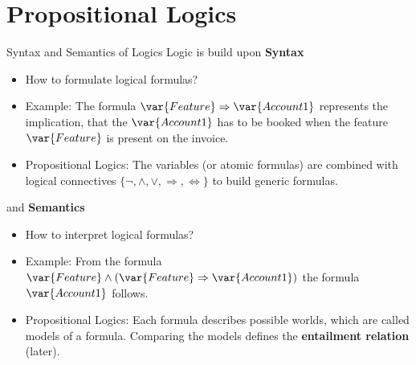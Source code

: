 \documentclass{beamer}
\begin{document}
    {\frame[plain]{\titlepage}}
    \showoutlineatsection

    \section{Propositional Logics}

    \begin{frame}{Syntax and Semantics of Logics}
        Logic is build upon
        \textbf{Syntax}
        \begin{itemize}
            \item How to formulate logical formulas?
            \item Example: The formula $\var{Feature}\Rightarrow\var{Account 1}$ represents the implication, that the $\var{Account 1}$ has to be booked when the feature $\var{Feature}$ is present on the invoice.
            \item Propositional Logics: The variables (or atomic formulas) are combined with logical connectives $\{\lnot, \land, \lor, \Rightarrow, \Leftrightarrow\}$ to build generic formulas.
        \end{itemize}
        and \textbf{Semantics}
        \begin{itemize}
            \item How to interpret logical formulas?
            \item Example: From the formula $\var{Feature}\land(\var{Feature}\Rightarrow\var{Account 1})$ the formula $\var{Account 1}$ follows.
            \item Propositional Logics: Each formula describes possible worlds, which are called models of a formula. Comparing the models defines the \textbf{entailment relation} (later).
        \end{itemize}
    \end{frame}
\end{document}
